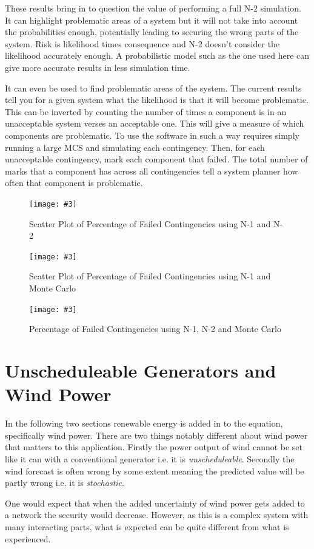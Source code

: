\documentclass[a4paper,oneside,12pt]{report}
\newcommand{\image}[3] {
  \begin{figure}
    \begin{center}
      \texttt{[image: \#3]}
      \caption{#2}
      \label{#1}
    \end{center}
  \end{figure}
}
\newenvironment{vivacorrections}
{}
{}
\begin{document}
\begin{vivacorrections}
These results bring in to question the value of performing a full N-2 simulation. It can highlight problematic areas of a system but it will not take into account the probabilities enough, potentially leading to securing the wrong parts of the system. Risk is likelihood times consequence and N-2 doesn't consider the likelihood accurately enough. A probabilistic model such as the one used here can give more accurate results in less simulation time. 

It can even be used to find problematic areas of the system. The current results tell you for a given system what the likelihood is that it will become problematic. This can be inverted by counting the number of times a component is in an unacceptable system verses an acceptable one. This will give a measure of which components are problematic. To use the software in such a way requires simply running a large MCS and simulating each contingency. Then, for each unacceptable contingency, mark each component that failed. The total number of marks that a component has across all contingencies tell a system planner how often that component is problematic. 

\end{vivacorrections}

\image{scatter-n1-n2}{Scatter Plot of Percentage of Failed Contingencies using N-1 and N-2}{scatter-n1-n2.png}
\image{scatter-mc-n2}{Scatter Plot of Percentage of Failed Contingencies using N-1 and Monte Carlo}{scatter-mc-n2.png}
\image{mc-n1-n2}{Percentage of Failed Contingencies using N-1, N-2 and Monte Carlo}{mc-n1-n2.png}
\clearpage

\section{Unscheduleable Generators and Wind Power}

In the following two sections renewable energy is added in to the equation, specifically wind power. There are two things notably different about wind power that matters to this application. Firstly the power output of wind cannot be set like it can with a conventional generator i.e. it is \emph{unscheduleable}. Secondly the wind forecast is often wrong by some extent meaning the predicted value will be partly wrong i.e. it is \emph{stochastic}. 

One would expect that when the added uncertainty of wind power gets added to a network the security would decrease. However, as this is a complex system with many interacting parts, what is expected can be quite different from what is experienced. 
\end{document}
